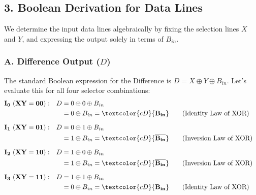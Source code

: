 \documentclass[12pt,a3paper]{article}
\begin{document}
\begin{enumerate}
\begin{tcolorbox}[enhanced,breakable,ansbox,colback=cD!4,colframe=cD,boxrule=0.8pt,arc=5pt,title={\textbf{Answer}},fonttitle=\bfseries\color{white},colbacktitle=cD]
\vspace{0.2cm}
\subsection*{3. Boolean Derivation for Data Lines}
We determine the input data lines algebraically by fixing the selection lines $X$ and $Y$, and expressing the output solely in terms of $B_{in}$.

\subsubsection*{A. Difference Output ($D$)}
The standard Boolean expression for the Difference is $D = X \oplus Y \oplus B_{in}$. Let's evaluate this for all four selector combinations:
\begin{align*}
    \mathbf{I_0 \ (XY=00):} \quad D &= 0 \oplus 0 \oplus B_{in} \\
    &= 0 \oplus B_{in} = \textcolor{cD}{\mathbf{B_{in}}} \quad &&\text{(Identity Law of XOR)} \\[6pt]
    \mathbf{I_1 \ (XY=01):} \quad D &= 0 \oplus 1 \oplus B_{in} \\
    &= 1 \oplus B_{in} = \textcolor{cD}{\mathbf{\overline{B_{in}}}} \quad &&\text{(Inversion Law of XOR)} \\[6pt]
    \mathbf{I_2 \ (XY=10):} \quad D &= 1 \oplus 0 \oplus B_{in} \\
    &= 1 \oplus B_{in} = \textcolor{cD}{\mathbf{\overline{B_{in}}}} \quad &&\text{(Inversion Law of XOR)} \\[6pt]
    \mathbf{I_3 \ (XY=11):} \quad D &= 1 \oplus 1 \oplus B_{in} \\
    &= 0 \oplus B_{in} = \textcolor{cD}{\mathbf{B_{in}}} \quad &&\text{(Identity Law of XOR)}
\end{align*}


\end{tcolorbox}
\end{enumerate}
\end{document}
